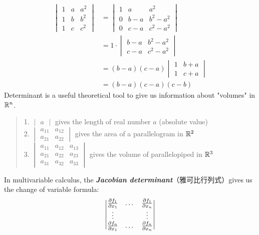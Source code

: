 \begin{align*}
    \begin{vmatrix}
        1 & a & a^2 \\
        1 & b & b^2 \\
        1 & c & c^2
    \end{vmatrix} &= \begin{vmatrix}
        1 & a & a^2 \\
        0 & b-a & b^2-a^2 \\
        0 & c-a & c^2-a^2
    \end{vmatrix} \\
    &= 1 \cdot \begin{vmatrix}
        b-a & b^2-a^2 \\
        c-a & c^2-a^2
    \end{vmatrix} \\
    &= (b-a)(c-a) \begin{vmatrix}
        1 & b+a \\
        1 & c+a
    \end{vmatrix} \\
    &= (b-a)(c-a)(c-b)
\end{align*}
Determinant is a useful theoretical tool to give us information about "volumes" in $\mathbb{R}^n$.
\begin{quote}
    1. $\begin{vmatrix}
        a
    \end{vmatrix}$ gives the length of real number $a$ (absolute value) \\
    2. $\begin{vmatrix}
        a_{11} & a_{12} \\
        a_{21} & a_{22}
    \end{vmatrix}$ gives the area of a parallelogram in $\mathbb{R}^2$ \\
    3.  $\begin{vmatrix}
        a_{11} & a_{12} & a_{13}\\
        a_{21} & a_{22} & a_{23} \\
        a_{31} & a_{32} & a_{33}
    \end{vmatrix}$ gives the volume of parallelopiped in $\mathbb{R}^3$
\end{quote}
In multivariable calculus, the \textbf{\textit{Jacobian determinant}}（雅可比行列式）gives us the change of variable formula:
$$\begin{vmatrix}
    \pdv{f_1}{x_1} & \dots & \pdv{f_1}{x_n} \\
    \vdots & & \vdots \\
    \pdv{f_n}{x_1} & \dots & \pdv{f_n}{x_n}
\end{vmatrix}$$
